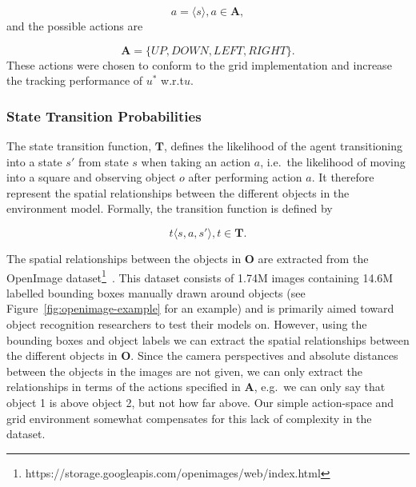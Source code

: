 \documentclass[a4paper, twoside]{article}
\begin{document}
\begin{equation}
  a = \langle{}s\rangle, a\in{}\mathbf{A},
\end{equation}
and the possible actions are

\begin{equation}
  \mathbf{A} = \{UP, DOWN, LEFT, RIGHT\}.
\end{equation}
These actions were chosen to conform to the grid implementation and increase the tracking performance of $u^*$ w.r.t\@ $u$. 

\subsubsection{State Transition Probabilities}

\noindent The state transition function, $\mathbf{T}$, defines the likelihood of the agent transitioning into a state $s'$ from state $s$ when taking an action $a$, i.e.\ the likelihood of moving into a square and observing object $o$ after performing action $a$. It therefore represent the spatial relationships between the different objects in the environment model. Formally, the transition function is defined by

\begin{equation}
  t\langle{}s, a, s'\rangle, t\in{}\mathbf{T}.
\end{equation}

The spatial relationships between the objects in $\mathbf{O}$ are extracted from the OpenImage dataset\footnote{https://storage.googleapis.com/openimages/web/index.html}~\cite{openimages}. This dataset consists of 1.74M images containing 14.6M labelled bounding boxes manually drawn around objects (see Figure~\ref{fig:openimage-example} for an example) and is primarily aimed toward object recognition researchers to test their models on. However, using the bounding boxes and object labels we can extract the spatial relationships between the different objects in $\mathbf{O}$. Since the camera perspectives and absolute distances between the objects in the images are not given, we can only extract the relationships in terms of the actions specified in $\mathbf{A}$, e.g.\ we can only say that object 1 is above object 2, but not how far above. Our simple action-space and grid environment somewhat compensates for this lack of complexity in the dataset. 
\end{document}
